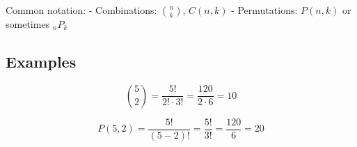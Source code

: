 \documentclass{article}
\begin{document}
\begin{multicols}{2}
Common notation:
- Combinations: \(\binom{n}{k}\), \(C(n,k)\)
- Permutations: \(P(n,k)\) or sometimes \(_nP_k\)

\subsection*{Examples}
\[
\binom{5}{2} = \frac{5!}{2! \cdot 3!} = \frac{120}{2 \cdot 6} = 10
\]

\[
P(5,2) = \frac{5!}{(5-2)!} = \frac{5!}{3!} = \frac{120}{6} = 20
\]

\end{multicols}
\end{document}
